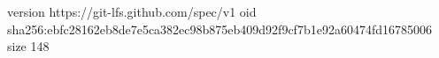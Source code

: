 version https://git-lfs.github.com/spec/v1
oid sha256:ebfc28162eb8de7e5ca382ec98b875eb409d92f9cf7b1e92a60474fd16785006
size 148
